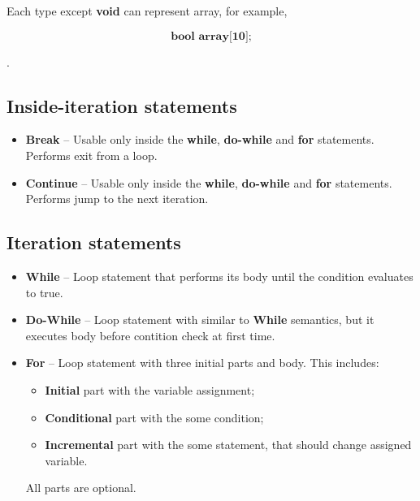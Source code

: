 \documentclass{article}
\begin{document}
            Each type except \textbf{void} can represent array, for example,

            $$\textbf{bool array[10];}$$

            .

        \subsection{Inside-iteration statements}
            \begin{itemize}
                \item \textbf{Break} -- Usable only inside the \textbf{while},
                        \textbf{do-while} and \textbf{for} statements. Performs exit from a
                        loop.

                \item \textbf{Continue} -- Usable only inside the \textbf{while},
                        \textbf{do-while} and \textbf{for} statements. Performs jump to
                        the next iteration.
            \end{itemize}

        \subsection{Iteration statements}
            \begin{itemize}
                  \item \textbf{While} -- Loop statement that performs its body until the
                        condition evaluates to true.

                  \item \textbf{Do-While} -- Loop statement with similar to \textbf{While}
                        semantics, but it executes body before contition check at first time.

                  \item \textbf{For} -- Loop statement with three initial parts and body.
                        This includes:
                        \begin{itemize}
                            \item \textbf{Initial} part with the variable assignment;
                            \item \textbf{Conditional} part with the some condition;
                            \item \textbf{Incremental} part with the some statement, that
                                  should change assigned variable.
                        \end{itemize}

                      All parts are optional.
            \end{itemize}
\end{document}
